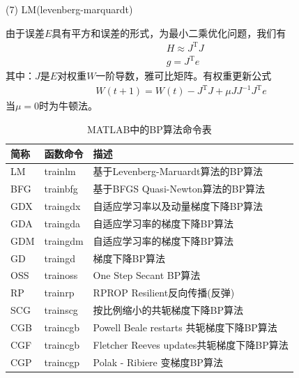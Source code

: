 {            (7) LM(levenberg-marquardt)
            \par
            由于误差$E$具有平方和误差的形式，为最小二乘优化问题，我们有
            \begin{align*}
            & H \approx J^\mathrm{T}J\\
            & g = J^\mathrm{T}e
            \end{align*}
            其中：$J$是$E$对权重$W$一阶导数，雅可比矩阵。有权重更新公式
            \begin{align*}
            W(t+1) = W(t) - J^\mathrm{T}J +\mu JJ^{-1}J^\mathrm{T}e
            \end{align*}
            当$\mu=0$时为牛顿法。

            \begin{table}[htbp]
              \caption{MATLAB中的BP算法命令表}
              \label{tab:MATLAB中的BP算法命令表}
              \centering
              \begin{tabular}{l l l}
              \toprule
              简称     & 函数命令   & 描述                                     \\
              \midrule
              LM       & trainlm    & 基于Levenberg-Maruardt算法的BP算法       \\
              BFG      & trainbfg   & 基于BFGS Quasi-Newton算法的BP算法        \\
              GDX      & traingdx   & 自适应学习率以及动量梯度下降BP算法       \\
              GDA      & traingda   & 自适应学习率的梯度下降BP算法             \\
              GDM      & traingdm   & 自适应学习率的梯度下降BP算法             \\
              GD       & traingd    & 梯度下降BP算法                           \\
              OSS      & trainoss   & One Step Secant BP算法                   \\
              RP       & trainrp    & RPROP Resilient反向传播(反弹)          \\
              SCG      & trainscg   & 按比例缩小的共轭梯度下降BP算法           \\
              CGB      & traincgb   & Powell Beale restarts 共轭梯度下降BP算法 \\
              CGF      & traincgb   & Fletcher Reeves updates共轭梯度下降BP算法\\
              CGP      & traincgp   & Polak - Ribiere 变梯度BP算法             \\

\end{tabular}
\end{table}}
